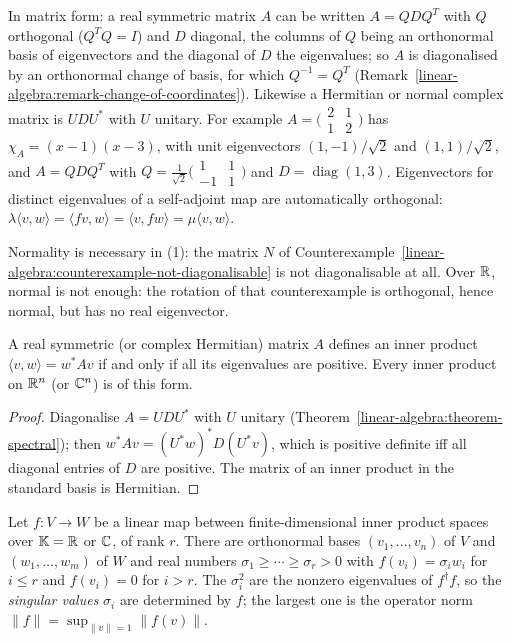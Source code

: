 In matrix form: a real symmetric matrix $A$ can be written $A = QDQ^T$ with $Q$ orthogonal ($Q^TQ = I$) and $D$ diagonal, the columns of $Q$ being an orthonormal basis of eigenvectors and the
diagonal of $D$ the eigenvalues; so $A$ is diagonalised by an orthonormal change of basis, for which $Q^{-1} = Q^T$ (Remark~\ref{linear-algebra:remark-change-of-coordinates}). Likewise a Hermitian
or normal complex matrix is $UDU^*$ with $U$ unitary. For example $A = \bigl(\begin{smallmatrix}2 & 1\\ 1 & 2\end{smallmatrix}\bigr)$ has $\chi_A = (x - 1)(x - 3)$, with unit eigenvectors
$(1, -1)/\sqrt2$ and $(1, 1)/\sqrt2$, and $A = QDQ^T$ with $Q = \frac1{\sqrt2}\bigl(\begin{smallmatrix}1 & 1\\ -1 & 1\end{smallmatrix}\bigr)$ and $D = \operatorname{diag}(1, 3)$. Eigenvectors for
distinct eigenvalues of a self-adjoint map are automatically orthogonal: $\lambda\langle v, w\rangle = \langle fv, w\rangle = \langle v, fw\rangle = \mu\langle v, w\rangle$.

\begin{counterexample}\label{linear-algebra:counterexample-spectral}
Normality is necessary in (1): the matrix $N$ of
Counterexample~\ref{linear-algebra:counterexample-not-diagonalisable} is not diagonalisable at all. Over $\mathbb{R}$,
normal is not enough: the rotation of that counterexample is orthogonal, hence normal, but has no real
eigenvector.
\end{counterexample}

\begin{corollary}\label{linear-algebra:corollary-positive-definite}
A real symmetric (or complex Hermitian) matrix $A$ defines an inner product $\langle v, w \rangle = w^* A v$ if and only
if all its eigenvalues are positive. Every inner product on $\mathbb{R}^n$ (or $\mathbb{C}^n$) is of this form.
\end{corollary}

\begin{proof}
Diagonalise $A = U D U^*$ with $U$ unitary (Theorem~\ref{linear-algebra:theorem-spectral}); then
$w^*Av = (U^*w)^* D (U^*v)$, which is positive definite iff all diagonal entries of $D$ are positive. The
matrix of an inner product in the standard basis is Hermitian.
\end{proof}

\begin{proposition}\label{linear-algebra:proposition-svd}
Let $f \colon V \to W$ be a linear map between finite-dimensional inner product spaces over $\mathbb{K} = \mathbb{R}$ or $\mathbb{C}$, of rank $r$. There are orthonormal bases $(v_1, \ldots, v_n)$ of $V$ and $(w_1, \ldots, w_m)$
of $W$ and real numbers $\sigma_1 \geq \cdots \geq \sigma_r > 0$ with $f(v_i) = \sigma_iw_i$ for $i \leq r$ and $f(v_i) = 0$ for $i > r$. The $\sigma_i^2$ are the nonzero eigenvalues of $f^\dagger f$, so the
\emph{singular values} $\sigma_i$ are determined by $f$; the largest one is the operator norm $\|f\| = \sup_{\|v\| = 1}\|f(v)\|$.
\end{proposition}


